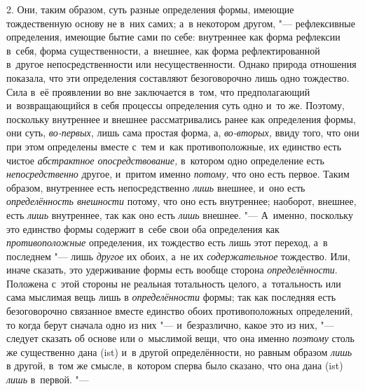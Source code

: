 2. Они, таким образом, суть разные определения формы, имеющие тождественную
основу не в~них самих; а~в некотором другом, "--- рефлексивные определения,
имеющие бытие сами по себе: внутреннее как форма рефлексии в~себя, форма
существенности, а~внешнее, как форма рефлектированной в~другое
непосредственности или несущественности. Однако природа отношения показала,
что эти определения составляют безоговорочно лишь одно тождество. Сила в~её
проявлении во вне заключается в~том, что предполагающий и~возвращающийся в
себя процессы определения суть одно и~то же. Поэтому, поскольку внутреннее
и внешнее рассматривались ранее как определения формы, они суть,
{\em во-первых,} лишь сама простая форма, а,
{\em во-вторых,} ввиду того, что они при этом
определены вместе с~тем и~как противоположные, их единство есть чистое
{\em абстрактное опосредствование,} в~котором одно
определение есть {\em непосредственно} другое, и~притом
именно {\em потому,} что оно есть первое. Таким
образом, внутреннее есть непосредственно {\em лишь}
внешнее, и~оно есть {\em определённость внешности}
потому, что оно есть внутреннее; наоборот, внешнее, есть
{\em лишь} внутреннее, так как оно есть
{\em лишь} внешнее. "--- А~именно, поскольку это единство
формы содержит в~себе свои оба определения как
{\em противоположные} определения, их тождество есть
лишь этот переход, а~в последнем "--- лишь {\em другое} их
обоих, а~не их {\em содержательное} тождество. Или,
иначе сказать, это удерживание формы есть вообще сторона
{\em определённости}. Положена с~этой стороны не
реальная тотальность целого, а~тотальность или сама мыслимая вещь лишь в
{\em определённости} формы; так как последняя есть
безоговорочно связанное вместе единство обоих противоположных определений,
то когда берут сначала одно из них "--- и~безразлично, какое это из них, "---
следует сказать об основе или о~мыслимой вещи, что она именно
{\em поэтому} столь же существенно дана (ist) и~в
другой определённости, но равным образом {\em лишь} в
другой, в~том же смысле, в~котором сперва было сказано, что она дана (ist)
{\em лишь} в~первой. "---

